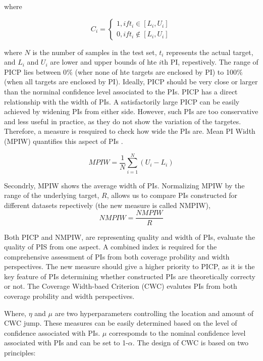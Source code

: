 \documentclass[review]{elsarticle}
\begin{document}
    where

    \begin{equation}
      C_{i} =
      \begin{cases}
        1, if t_{i} \in [L_{i},U_{i}] \\
        0, if t_{i} \not\in [L_{i},U_{i}]
      \end{cases}
      \label{eq.Ci}
    \end{equation}

    where $N$ is the number of samples in the test set, $t_{i}$ represents the actual target, and $L_{i}$ and $U_{i}$ are lower and upper bounds of hte $i$th PI, repestively. The range of PICP lies between 0$\%$ (wher none of hte targets are enclosed by PI) to 100$\%$ (when all targets are enclosed by PI). Ideally, PICP should be very close or larger than the norminal confidence level associated to the PIs.
    PICP has a direct relationship with the width of PIs. A satisfactorily large PICP can be easily achieved by widening PIs from either side. However, such PIs are too conservative and less useful in practice, as they do not show the variation of the targetes. Therefore, a measure is resquired to check how wide the PIs are. Mean PI Width (MPIW) quantifies this aspect of PIs \cite{Khosravi2010}.

    \begin{equation}
      MPIW = \frac{1}{N} \sum_{i=1}^{N} (U_{i}-L_{i})
      \label{eq.MPIW}
    \end{equation}

    Secondrly, MPIW shows the average width of PIs. Normalizing MPIW by the range of the underlying target, $R$, allows us to compare PIs constructed for different datasets repectively (the new measure is called NMPIW),
    \begin{equation}
      NMPIW = \frac{NMPIW}{R}
      \label{eq.NMPIW}
    \end{equation}

    Both PICP and NMPIW, are representing quality and width of PIs, evaluate the quality of PIS from one aspect. A combined index is required for the comprehensive assessment of PIs from both coverage probility and width perspectives. The new measure should give a higher priority to PICP, as it is the key feature of PIs determining whether constructed PIs are theoretically correcty or not. The Coverage Width-baed Criterion (CWC) evalutes PIs from both coverage probility and width perspectives.

    Where, $\eta$ and $\mu$ are two hyperparameters controlling the location and amount of CWC jump. These measures can be easily determined based on the level of confidence associated with PIs. $\mu$ correspomds to the nominal confidence level associated with PIs and can be set to 1-$\alpha$. The design of CWC is based on two principles:
\end{document}
